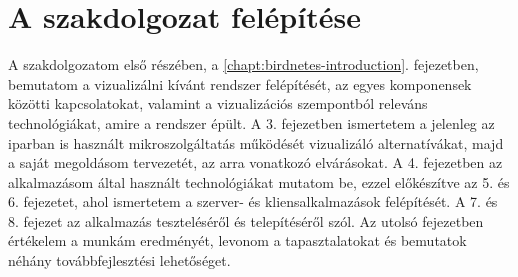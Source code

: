 \section{A szakdolgozat felépítése}
A szakdolgozatom első részében, a \ref{chapt:birdnetes-introduction}. fejezetben, bemutatom a vizualizálni kívánt rendszer felépítését, az egyes komponensek közötti kapcsolatokat,
valamint a vizualizációs szempontból releváns technológiákat, amire a rendszer épült.
A 3. fejezetben ismertetem a jelenleg az iparban is használt mikroszolgáltatás működését vizualizáló alternatívákat, majd a saját megoldásom tervezetét, az arra vonatkozó elvárásokat.
A 4. fejezetben az alkalmazásom által használt technológiákat mutatom be, ezzel előkészítve az 5. és 6. fejezetet, ahol ismertetem a szerver- és kliensalkalmazások felépítését.
A 7. és 8. fejezet az alkalmazás teszteléséről és telepítéséről szól.
Az utolsó fejezetben értékelem a munkám eredményét, levonom a tapasztalatokat és bemutatok néhány továbbfejlesztési lehetőséget.